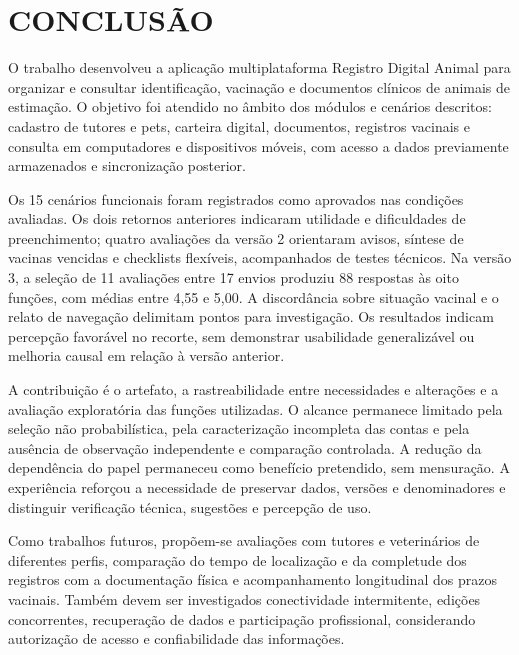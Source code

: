 \documentclass{UNESC}
\begin{document}
\section{CONCLUSÃO}

O trabalho desenvolveu a aplicação multiplataforma Registro Digital Animal para organizar e consultar identificação, vacinação e documentos clínicos de animais de estimação. O objetivo foi atendido no âmbito dos módulos e cenários descritos: cadastro de tutores e pets, carteira digital, documentos, registros vacinais e consulta em computadores e dispositivos móveis, com acesso a dados previamente armazenados e sincronização posterior.

Os 15 cenários funcionais foram registrados como aprovados nas condições avaliadas. Os dois retornos anteriores indicaram utilidade e dificuldades de preenchimento; quatro avaliações da versão 2 orientaram avisos, síntese de vacinas vencidas e checklists flexíveis, acompanhados de testes técnicos. Na versão 3, a seleção de 11 avaliações entre 17 envios produziu 88 respostas às oito funções, com médias entre 4,55 e 5,00. A discordância sobre situação vacinal e o relato de navegação delimitam pontos para investigação. Os resultados indicam percepção favorável no recorte, sem demonstrar usabilidade generalizável ou melhoria causal em relação à versão anterior.

A contribuição é o artefato, a rastreabilidade entre necessidades e alterações e a avaliação exploratória das funções utilizadas. O alcance permanece limitado pela seleção não probabilística, pela caracterização incompleta das contas e pela ausência de observação independente e comparação controlada. A redução da dependência do papel permaneceu como benefício pretendido, sem mensuração. A experiência reforçou a necessidade de preservar dados, versões e denominadores e distinguir verificação técnica, sugestões e percepção de uso.

Como trabalhos futuros, propõem-se avaliações com tutores e veterinários de diferentes perfis, comparação do tempo de localização e da completude dos registros com a documentação física e acompanhamento longitudinal dos prazos vacinais. Também devem ser investigados conectividade intermitente, edições concorrentes, recuperação de dados e participação profissional, considerando autorização de acesso e confiabilidade das informações.


\renewcommand{\refname}{REFERÊNCIAS}

\end{document}
